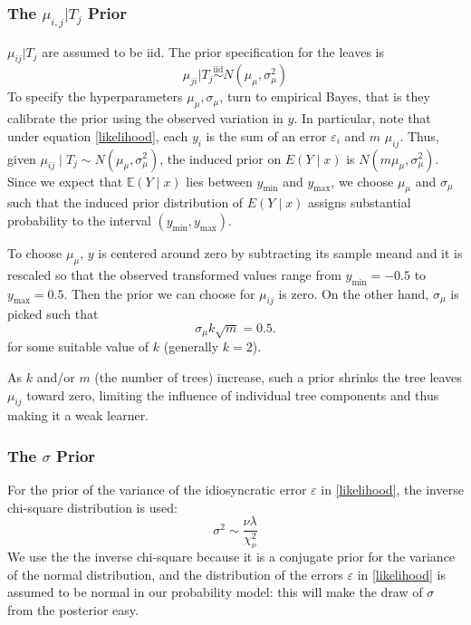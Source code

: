 \documentclass[a4paper,11pt]{article}
\begin{document}
\subsubsection{The \( \mu_{i,j} | T_j \) Prior}
$\mu_{ij} | T_j$ are assumed to be iid. The prior specification for the leaves is $$ \mu_{ji} |T_j \overset{\text{iid}}{\sim}N(\mu_\mu, \sigma_\mu^2)$$
To specify the hyperparameters $\mu_\mu, \sigma_\mu$, \cite{chipmanBARTBayesianAdditive2010} turn to empirical Bayes, that is they  calibrate the prior using the observed variation in \( y \). In particular, note that under equation \eqref{likelihood}, each $y_i$ is the sum of an error $\varepsilon_i$ and $m$ $\mu_{ij}$. Thus, given $\mu_{ij} \mid T_j \sim N(\mu_\mu, \sigma^2_\mu)$, the induced prior on $E(Y \mid x)$ is \(N(m\mu_\mu, \sigma^2_\mu)\). Since we expect that \(\mathbb{E}(Y \mid x)\) lies between \(y_{\text{min}}\) and \(y_{\text{max}}\), we choose \(\mu_\mu\) and \(\sigma_\mu\) such that the induced prior distribution of $E(Y \mid x)$ assigns substantial probability to the interval \((y_{\text{min}}, y_{\text{max}})\). 

To choose $\mu_\mu$, \( y \) is centered around zero by subtracting its sample meand and it is rescaled so that the observed transformed values range from \( y_{\text{min}} = -0.5 \) to \( y_{\text{max}} = 0.5 \). Then the prior we can choose for $\mu_{ij}$ is zero.
On the other hand, $\sigma_\mu$ is picked such that
\[
\sigma_\mu k\sqrt{m} = 0.5.
\]
for some suitable value of $k$ (generally $k=2$).


As \(k\) and/or \(m\) (the number of trees) increase, such a prior shrinks the tree leaves \(\mu_{ij}\) toward zero, limiting the influence of individual tree components and thus making it a weak learner. 

\subsubsection{The \( \sigma \) Prior}
For the prior of the variance of the idiosyncratic error $\varepsilon$ in \eqref{likelihood}, the inverse chi-square distribution is used:
\[
\sigma^2 \sim \frac{\nu \lambda}{\chi^2_\nu} 
\]
We use the the inverse chi-square because it is a conjugate prior for the variance of the normal distribution, and the distribution of the errors $\varepsilon$ in \eqref{likelihood} is assumed to be normal in our probability model: this will make the draw of $\sigma$ from the posterior easy.
\end{document}
